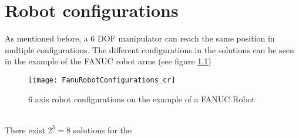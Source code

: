 \chapter{Robot configurations} \label{sec:RobConf}

As mentioned before, a 6 \ac{DOF} manipulator can reach the same position in multiple configurations.
The different configurations in the solutions can be seen in the example of the FANUC robot arms (see figure \ref{fig:RobotConfigs})
\medskip

\begin{figure}[H]
	\texttt{[image: FanuRobotConfigurations\_cr]}
	\caption{6 axis robot configurations on the example of a FANUC Robot \cite{QingFanucAcademy}}
	\label{fig:RobotConfigs}
\end{figure}
\phantom{}\\
There exist $2^3=8$ solutions for the 

\phantom{}\\

